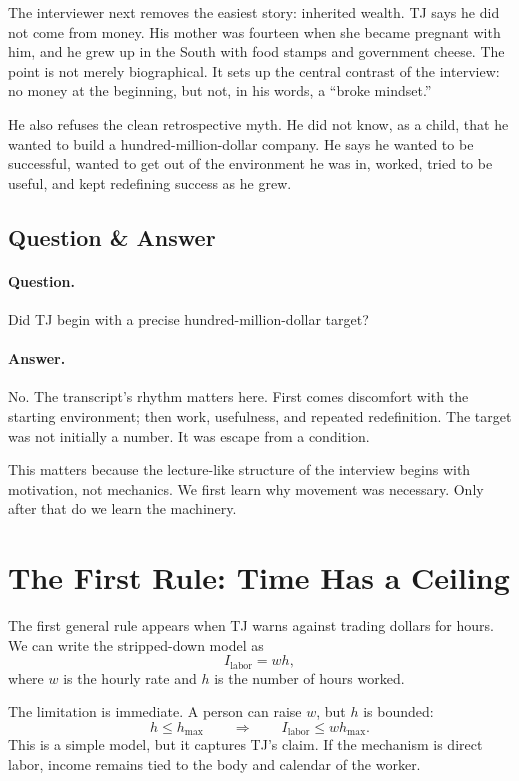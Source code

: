 The interviewer next removes the easiest story: inherited wealth. TJ says he did not come from money. His mother was fourteen when she became pregnant with him, and he grew up in the South with food stamps and government cheese. The point is not merely biographical. It sets up the central contrast of the interview: no money at the beginning, but not, in his words, a ``broke mindset.''

He also refuses the clean retrospective myth. He did not know, as a child, that he wanted to build a hundred-million-dollar company. He says he wanted to be successful, wanted to get out of the environment he was in, worked, tried to be useful, and kept redefining success as he grew.

\subsection{Question \& Answer}

\paragraph{Question.} Did TJ begin with a precise hundred-million-dollar target?

\paragraph{Answer.} No. The transcript's rhythm matters here. First comes discomfort with the starting environment; then work, usefulness, and repeated redefinition. The target was not initially a number. It was escape from a condition.

This matters because the lecture-like structure of the interview begins with motivation, not mechanics. We first learn why movement was necessary. Only after that do we learn the machinery.

\section{The First Rule: Time Has a Ceiling}

The first general rule appears when TJ warns against trading dollars for hours. We can write the stripped-down model as
\begin{equation}
I_{\mathrm{labor}} = w h,
\end{equation}
where \(w\) is the hourly rate and \(h\) is the number of hours worked.

The limitation is immediate. A person can raise \(w\), but \(h\) is bounded:
\begin{equation}
h \leq h_{\max}
\qquad\Longrightarrow\qquad
I_{\mathrm{labor}} \leq w h_{\max}.
\end{equation}
This is a simple model, but it captures TJ's claim. If the mechanism is direct labor, income remains tied to the body and calendar of the worker.

